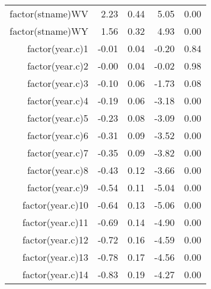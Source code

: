 \begin{table}[ht]
\begin{tabular}{rrrrr}
  factor(stname)WV & 2.23 & 0.44 & 5.05 & 0.00 \\ 
  factor(stname)WY & 1.56 & 0.32 & 4.93 & 0.00 \\ 
  factor(year.c)1 & -0.01 & 0.04 & -0.20 & 0.84 \\ 
  factor(year.c)2 & -0.00 & 0.04 & -0.02 & 0.98 \\ 
  factor(year.c)3 & -0.10 & 0.06 & -1.73 & 0.08 \\ 
  factor(year.c)4 & -0.19 & 0.06 & -3.18 & 0.00 \\ 
  factor(year.c)5 & -0.23 & 0.08 & -3.09 & 0.00 \\ 
  factor(year.c)6 & -0.31 & 0.09 & -3.52 & 0.00 \\ 
  factor(year.c)7 & -0.35 & 0.09 & -3.82 & 0.00 \\ 
  factor(year.c)8 & -0.43 & 0.12 & -3.66 & 0.00 \\ 
  factor(year.c)9 & -0.54 & 0.11 & -5.04 & 0.00 \\ 
  factor(year.c)10 & -0.64 & 0.13 & -5.06 & 0.00 \\ 
  factor(year.c)11 & -0.69 & 0.14 & -4.90 & 0.00 \\ 
  factor(year.c)12 & -0.72 & 0.16 & -4.59 & 0.00 \\ 
  factor(year.c)13 & -0.78 & 0.17 & -4.56 & 0.00 \\ 
  factor(year.c)14 & -0.83 & 0.19 & -4.27 & 0.00 \\ 
   \hline
\end{tabular}
\end{table}
